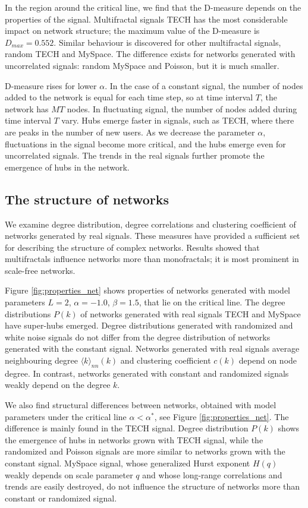In the region around the critical line, we find that the D-measure depends on the properties of the signal. Multifractal signals TECH has the most considerable impact on network structure; the maximum value of the D-measure is $D_{max}=0.552$. Similar behaviour is discovered for other multifractal signals, random TECH and MySpace. The difference exists for networks generated with uncorrelated signals: random MySpace and Poisson, but it is much smaller.

D-measure rises for lower $\alpha$. In the case of a constant signal, the number of nodes added to the network is equal for each time step, so at time interval $T$, the network has $MT$ nodes. In fluctuating signal, the number of nodes added during time interval $T$ vary. Hubs emerge faster in signals, such as TECH, where there are peaks in the number of new users. As we decrease the parameter $\alpha$, fluctuations in the signal become more critical, and the hubs emerge even for uncorrelated signals. The trends in the real signals further promote the emergence of hubs in the network.  

\subsection{The structure of networks}

We examine degree distribution, degree correlations and clustering coefficient of networks generated by real signals. These measures have provided a sufficient set for describing the structure of complex networks. Results showed that multifractals influence networks more than monofractals; it is most prominent in scale-free networks. 

Figure \ref{fig:properties_net} shows properties of networks generated with model parameters $L=2$, $\alpha=-1.0$, $\beta=1.5$, that lie on the critical line. The degree distributions $P(k)$ of networks generated with real signals TECH and MySpace have super-hubs emerged. Degree distributions generated with randomized and white noise signals do not differ from the degree distribution of networks generated with the constant signal. Networks generated with real signals average neighbouring degree $\langle k\rangle_{nn}(k)$ and clustering coefficient $c(k)$ depend on node degree. In contrast, networks generated with constant and randomized signals weakly depend on the degree $k$.

We also find structural differences between networks, obtained with model parameters under the critical line $\alpha<\alpha^{*}$, see Figure \ref{fig:properties_net}. The difference is mainly found in the TECH signal. Degree distribution $P(k)$ shows the emergence of hubs in networks grown with TECH signal, while the randomized and Poisson signals are more similar to networks grown with the constant signal. MySpace signal, whose generalized Hurst exponent $H(q)$ weakly depends on scale parameter $q$ and whose long-range correlations and trends are easily destroyed, do not influence the structure of networks more than constant or randomized signal.   

